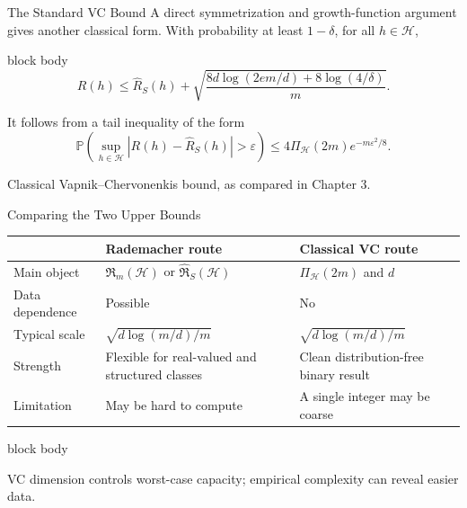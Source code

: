 \documentclass[aspectratio=169,10pt]{beamer}
\newcommand{\Hc}{\mathcal{H}}
\newcommand{\Rhat}{\widehat{R}_S}
\newcommand{\Rad}{\mathfrak{R}}
\newcommand{\RadS}{\widehat{\mathfrak{R}}_S}
\newcommand{\PiH}{\Pi_{\Hc}}
\newcommand{\eps}{\varepsilon}
\newcommand{\Prb}{\mathbb{P}}
\newcommand{\abs}[1]{\left\lvert #1\right\rvert}
\newcommand{\SourceNote}[1]{%
  \vfill
  \begin{flushright}
    {\scriptsize\color{midgray}#1}
  \end{flushright}
}
\newcommand{\KeyBox}[1]{%
  \begin{beamercolorbox}[rounded=true,sep=0.22cm,wd=\linewidth]{block body}
    #1
  \end{beamercolorbox}%
}
\begin{document}
\begin{frame}[t]{The Standard VC Bound}
  \vspace{0.02cm}
  A direct symmetrization and growth-function argument gives another classical form. With probability at least $1-\delta$, for all $h\in\Hc$,
  \begin{beamercolorbox}[rounded=true,sep=0.18cm,wd=\linewidth]{block body}
    \[
      \boxed{
      R(h)\le\Rhat(h)
      +\sqrt{
        \frac{8d\log(2em/d)+8\log(4/\delta)}{m}
      }.}
    \]
  \end{beamercolorbox}
  \vspace{0.10cm}
  It follows from a tail inequality of the form
  \[
    \Prb\!\left(\sup_{h\in\Hc}\abs{R(h)-\Rhat(h)}>\eps\right)
    \le 4\PiH(2m)e^{-m\eps^2/8}.
  \]
  \SourceNote{Classical Vapnik--Chervonenkis bound, as compared in Chapter 3.}
\end{frame}

\begin{frame}[t]{Comparing the Two Upper Bounds}
  \vspace{0.01cm}
  {\small
  \renewcommand{\arraystretch}{1.17}
  \begin{center}
  \begin{tabular}{p{2.55cm}p{4.15cm}p{4.15cm}}
    \toprule
     & \textbf{Rademacher route} & \textbf{Classical VC route}\\
    \midrule
    Main object & $\Rad_m(\Hc)$ or $\RadS(\Hc)$ & $\PiH(2m)$ and $d$\\
    Data dependence & Possible & No\\
    Typical scale & $\sqrt{d\log(m/d)/m}$ & $\sqrt{d\log(m/d)/m}$\\
    Strength & Flexible for real-valued and structured classes & Clean distribution-free binary result\\
    Limitation & May be hard to compute & A single integer may be coarse\\
    \bottomrule
  \end{tabular}
  \end{center}}
  \vspace{0.08cm}
  \KeyBox{\small\raggedright VC dimension controls worst-case capacity; empirical complexity can reveal easier data.\par}
\end{frame}
\end{document}
